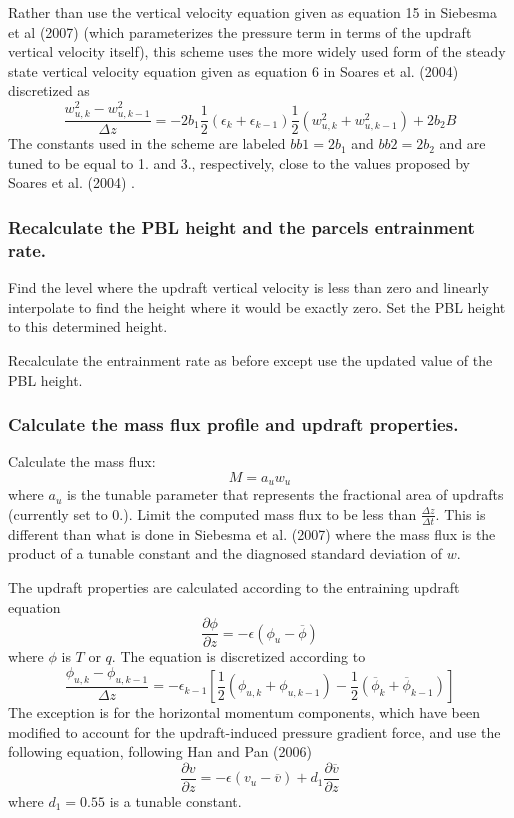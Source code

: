 Rather than use the vertical velocity equation given as equation 15 in Siebesma et al (2007) \cite{siebesma_et_al_2007} (which parameterizes the pressure term in terms of the updraft vertical velocity itself), this scheme uses the more widely used form of the steady state vertical velocity equation given as equation 6 in Soares et al. (2004) \cite{soares_et_al_2004} discretized as \[ \frac{w_{u,k}^2 - w_{u,k-1}^2}{\Delta z} = -2b_1\frac{1}{2}\left(\epsilon_k + \epsilon_{k-1}\right)\frac{1}{2}\left(w_{u,k}^2 + w_{u,k-1}^2\right) + 2b_2B \] The constants used in the scheme are labeled $bb1 = 2b_1$ and $bb2 = 2b_2$ and are tuned to be equal to 1. and 3., respectively, close to the values proposed by Soares et al. (2004) \cite{soares_et_al_2004} .

\subsubsection*{Recalculate the P\+BL height and the parcel\textquotesingle{}s entrainment rate.}

Find the level where the updraft vertical velocity is less than zero and linearly interpolate to find the height where it would be exactly zero. Set the P\+BL height to this determined height.

Recalculate the entrainment rate as before except use the updated value of the P\+BL height.

\subsubsection*{Calculate the mass flux profile and updraft properties.}

Calculate the mass flux\+: \[ M = a_uw_u \] where $a_u$ is the tunable parameter that represents the fractional area of updrafts (currently set to 0.). Limit the computed mass flux to be less than $\frac{\Delta z}{\Delta t}$. This is different than what is done in Siebesma et al. (2007) \cite{siebesma_et_al_2007} where the mass flux is the product of a tunable constant and the diagnosed standard deviation of $w$.

The updraft properties are calculated according to the entraining updraft equation \[ \frac{\partial \phi}{\partial z}=-\epsilon\left(\phi_u - \overline{\phi}\right) \] where $\phi$ is $T$ or $q$. The equation is discretized according to \[ \frac{\phi_{u,k} - \phi_{u,k-1}}{\Delta z}=-\epsilon_{k-1}\left[\frac{1}{2}\left(\phi_{u,k} + \phi_{u,k-1}\right)-\frac{1}{2}\left(\overline{\phi}_k + \overline{\phi}_{k-1}\right)\right] \] The exception is for the horizontal momentum components, which have been modified to account for the updraft-\/induced pressure gradient force, and use the following equation, following Han and Pan (2006) \cite{han_and_pan_2006} \[ \frac{\partial v}{\partial z} = -\epsilon\left(v_u - \overline{v}\right)+d_1\frac{\partial \overline{v}}{\partial z} \] where $d_1=0.55$ is a tunable constant. 

